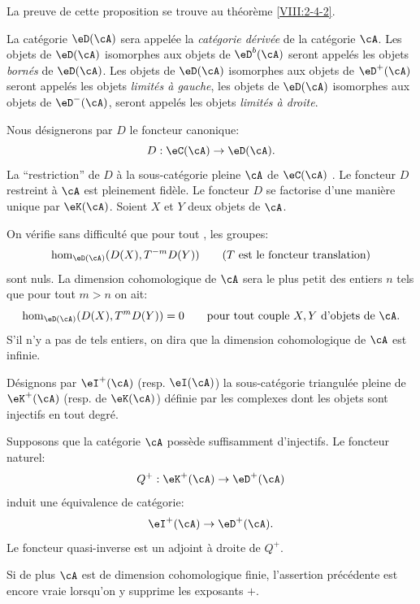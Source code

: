 La preuve de cette proposition se trouve au théorème \ref{VIII:2-4-2}. 





\begin{definition}\label{VIII:3-1-3}
La catégorie $\eD(\cA)$ sera appelée la \emph{catégorie dérivée} de la 
catégorie $\cA$. Les objets de $\eD(\cA)$ isomorphes aux objets de $\eD^b(\cA)$ 
seront appelés les objets \emph{bornés} de $\eD(\cA)$. Les objets de 
$\eD(\cA)$ isomorphes aux objets de $\eD^+(\cA)$ seront appelés les objets 
\emph{limités à gauche}, les objets de $\eD(\cA)$ isomorphes aux objets de 
$\eD^-(\cA)$, seront appelés les objets \emph{limités à droite}. 
\end{definition}

Nous désignerons par $D$ le foncteur canonique: 
\[
  D : \eC(\cA) \to \eD(\cA) \text{.}
\]
La ``restriction'' de $D$ à la sous-catégorie pleine $\cA$ de $\eC(\cA)$ 
. Le foncteur $D$ restreint à $\cA$ est pleinement 
fidèle. Le foncteur $D$ se factorise d'une manière unique par $\eK(\cA)$. 
Soient $X$ et $Y$ deux objets de $\cA$. 

On vérifie sans difficulté que pour tout , les groupes: 
\[
  \hom_{\eD(\cA)}(D(X),T^{-m} D(Y)) \qquad \text{($T$ est le foncteur translation)} 
\]
sont nuls. La dimension cohomologique de $\cA$ sera le plus petit des entiers 
$n$ tels que pour tout $m>n$ on ait: 
\[
  \hom_{\eD(\cA)}(D(X),T^m D(Y)) = 0 \qquad\text{pour tout couple $X,Y$ d'objets de $\cA$.} 
\]
S'il n'y a pas de tels entiers, on dira que la dimension cohomologique de $\cA$ 
est infinie. 

Désignons par $\eI^+(\cA)$ (resp. $\eI(\cA)$) la sous-catégorie triangulée 
pleine de $\eK^+(\cA)$ (resp. de $\eK(\cA)$) définie par les complexes dont 
les objets sont injectifs en tout degré. 





\begin{proposition}\label{VIII:3-1-4}
Supposons que la catégorie $\cA$ possède suffisamment d'injectifs. Le 
foncteur naturel: 
\[
  Q^+:\eK^+(\cA) \to \eD^+(\cA) 
\]
induit une équivalence de catégorie: 
\[
  \eI^+(\cA) \to \eD^+(\cA)  \text{.}
\]
Le foncteur quasi-inverse est un adjoint à droite de $Q^+$. 
\end{proposition}

Si de plus $\cA$ est de dimension cohomologique finie, l'assertion 
précédente est encore vraie lorsqu'on y supprime les exposants $+$. 

